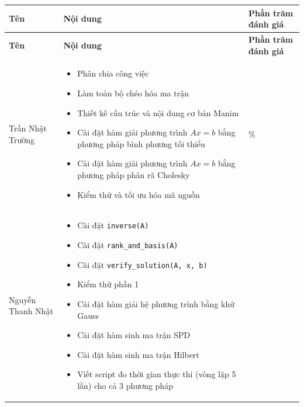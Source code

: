 \documentclass[a4paper]{article}
\begin{document}
\begingroup
\small
\setlength{\tabcolsep}{4pt}
\renewcommand{\arraystretch}{1.15}
\begin{longtable}{|>{\raggedright\arraybackslash}p{}|>{\raggedright\arraybackslash}p{}|>{\centering\arraybackslash}p{}|}

\hline
\textbf{Tên} & \textbf{Nội dung} & \textbf{Phần trăm đánh giá} \\ \hline
\endfirsthead
\hline
\textbf{Tên} & \textbf{Nội dung} & \textbf{Phần trăm đánh giá} \\ \hline
\endhead
Trần Nhật Trường & \begin{itemize}[leftmargin=*, noitemsep, topsep=0pt, partopsep=0pt]
                        \item Phân chia công việc
                        \item Làm toàn bộ chéo hóa ma trận 
                        \item Thiết kế cấu trúc và nội dung cơ bản Manim 
                        \item Cài đặt hàm giải phương trình $Ax = b$ bằng phương pháp bình phương tối thiểu 
                        \item Cài đặt hàm giải phương trình $Ax = b$ bằng phương pháp phân rã Cholesky
                        \item Kiểm thử và tối ưu hóa mã nguồn
                    \end{itemize} & 100\% \\ \hline
Nguyễn Thanh Nhật   & \begin{itemize}[leftmargin=*, noitemsep, topsep=0pt, partopsep=0pt]
                        \item Cài đặt \texttt{inverse(A)} 
                        \item Cài đặt \texttt{rank\_and\_basis(A)} 
                        \item Cài đặt \texttt{verify\_solution(A, x, b)} 
                        \item Kiểm thử phần 1
                        \item Cài đặt hàm giải hệ phương trình bằng khử Gauss
                        \item Cài đặt hàm sinh ma trận SPD
                        \item Cài đặt hàm sinh ma trận Hilbert
                        \item Viết script đo thời gian thực thi (vòng lặp 5 lần) cho cả 3 phương pháp


\end{itemize}
\end{longtable}
\end{document}

